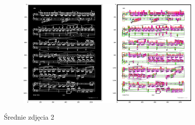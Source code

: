 \documentclass[12pt]{article}
\begin{document}
\begin{enumerate}
\begin{figure}[h!]
\begin{subfigure}[b]{0.48\linewidth}
				\end{subfigure}
				\begin{subfigure}[b]{0.48\linewidth}
					\includegraphics[width=\linewidth]{Medium/Zdj19.png}
				\end{subfigure}
				\label{fig:nuuty2}
				\caption{Średnie zdjęcia 2}
			\end{figure}
		

\end{enumerate}
\end{document}
